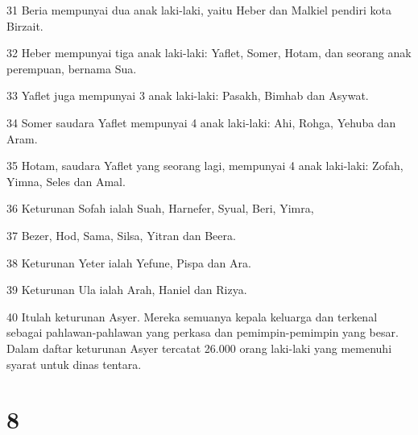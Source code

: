 \par 31 Beria mempunyai dua anak laki-laki, yaitu Heber dan Malkiel pendiri kota Birzait.
\par 32 Heber mempunyai tiga anak laki-laki: Yaflet, Somer, Hotam, dan seorang anak perempuan, bernama Sua.
\par 33 Yaflet juga mempunyai 3 anak laki-laki: Pasakh, Bimhab dan Asywat.
\par 34 Somer saudara Yaflet mempunyai 4 anak laki-laki: Ahi, Rohga, Yehuba dan Aram.
\par 35 Hotam, saudara Yaflet yang seorang lagi, mempunyai 4 anak laki-laki: Zofah, Yimna, Seles dan Amal.
\par 36 Keturunan Sofah ialah Suah, Harnefer, Syual, Beri, Yimra,
\par 37 Bezer, Hod, Sama, Silsa, Yitran dan Beera.
\par 38 Keturunan Yeter ialah Yefune, Pispa dan Ara.
\par 39 Keturunan Ula ialah Arah, Haniel dan Rizya.
\par 40 Itulah keturunan Asyer. Mereka semuanya kepala keluarga dan terkenal sebagai pahlawan-pahlawan yang perkasa dan pemimpin-pemimpin yang besar. Dalam daftar keturunan Asyer tercatat 26.000 orang laki-laki yang memenuhi syarat untuk dinas tentara.

\chapter{8}

